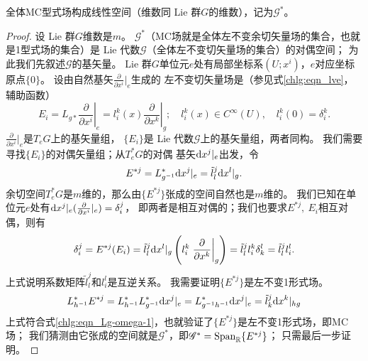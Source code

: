 \begin{theorem}\label{chlg:thm_lfspace}
    全体MC型式场构成线性空间（维数同 Lie 群$G$的维数），记为$\mathscr{G}^*$。
\end{theorem}
\begin{proof}
    设 Lie 群$G$维数是$m$。
    $\mathscr{G}^*$（MC场就是全体左不变余切矢量场的集合，也就是1型式场的集合）是
     Lie 代数$\mathscr{G}$（全体左不变切矢量场的集合）的对偶空间；
    为此我们先叙述$\mathscr{G}$的基矢量。
     Lie 群$G$单位元$e$处有局部坐标系$(U;x^i)$，$e$对应坐标原点$\{0\}$。
    设由自然基矢$\frac{\partial }{\partial x^i}|_{e}$生成的
    左不变切矢量场是（参见式\eqref{chlg:eqn_lve}，辅助函数）
    \begin{equation}
        E_i = L_{g*} \left.\frac{\partial }{\partial x^i}\right|_{e} =
        l^k_i(x) \left.\frac{\partial }{\partial x^k}\right|_{g}; \quad
        l^k_i(x) \in C^\infty(U) , \quad l^k_i(0)=\delta^k_i .
    \end{equation}
    $\frac{\partial }{\partial x^i}|_{e}$是$T_eG$上的基矢量组，
    $\{E_i\}$是 Lie 代数$\mathscr{G}$上的基矢量组，两者同构。
    我们需要寻找$\{E_i\}$的对偶矢量组；从$T^*_eG$的对偶
    基矢${\rm d}x^j |_{e}$出发，令
    \begin{equation}
        E^{*j}= L^*_{g^{-1}} {\rm d}x^j |_{e} = \tilde{l}^j_l {\rm d}x^l |_{g}.
    \end{equation}
    余切空间$T_e^*G$是$m$维的，那么由$\{E^{*j}\}$张成的空间自然也是$m$维的。
    我们已知在单位元$e$处有${\rm d}x^j |_{e} (\frac{\partial }{\partial x^i}|_{e})=\delta^j_i$，
    即两者是相互对偶的；我们也要求$E^{*j},\ E_i$相互对偶，则有
    \begin{equation}\label{chlg:eqn_tmpinv}
        \delta^j_i = E^{*j}( E_i ) = \tilde{l}^j_l {\rm d}x^l |_{g}
        \left(l^k_i \left.\frac{\partial }{\partial x^k}\right|_{g}\right)
        =\tilde{l}^j_l l^k_i \delta^l_k 
        =\tilde{l}^j_l l^l_i .
    \end{equation}
    上式说明系数矩阵$\tilde{l}^j_l$和$ l^l_i$是互逆关系。
    我需要证明$\{E^{*j}\}$是左不变1形式场。
    \begin{equation}
        L^*_{h^{-1}}E^{*j}= L^*_{h^{-1}} L^*_{g^{-1}} {\rm d}x^j |_{e}
        = L^*_{g^{-1}h^{-1}} {\rm d}x^j |_{e}
        =\tilde{l}^j_k {\rm d}x^k |_{hg}
    \end{equation}
    上式符合式\eqref{chlg:eqn_Lg-omega-1}，也就验证了$\{E^{*j}\}$是左不变1形式场，即MC场；
    我们猜测由它张成的空间就是$\mathscr{G}^*$，即$\mathscr{G}^*={\rm Span}_{\mathbb{R}}\{E^{*j}\}$；
    只需最后一步证明。
    

\end{proof}
